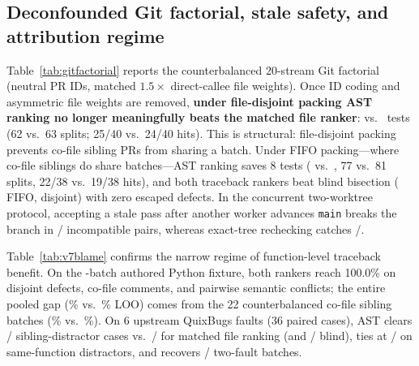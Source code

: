\subsection{Deconfounded Git factorial, stale safety, and attribution regime}

Table~\ref{tab:gitfactorial} reports the counterbalanced 20-stream Git factorial (neutral PR IDs, matched $1.5\times$ direct-callee file weights). Once ID coding and asymmetric file weights are removed, \textbf{under file-disjoint packing AST ranking no longer meaningfully beats the matched file ranker}: \GitDisjAstTests{} vs.\ \GitDisjFileTests{} tests (62 vs.\ 63 splits; 25/40 vs.\ 24/40 hits). This is structural: file-disjoint packing prevents co-file sibling PRs from sharing a batch. Under FIFO packing---where co-file siblings do share batches---AST ranking saves 8 tests (\GitFifoAstTests{} vs.\ \GitFifoFileTests{}, 77 vs.\ 81 splits, 22/38 vs.\ 19/38 hits), and both traceback rankers beat blind bisection (\GitFifoBisectTests{} FIFO, \GitDisjBisectTests{} disjoint) with zero escaped defects. In the concurrent two-worktree protocol, accepting a stale pass after another worker advances \texttt{main} breaks the branch in \StaleUnsafeEscapes{}/\StalePairsN{} incompatible pairs, whereas exact-tree rechecking catches \StaleRecheckCatches{}/\StalePairsN{}.

Table~\ref{tab:v7blame} confirms the narrow regime of function-level traceback benefit. On the \BlameTotalN{}-batch authored Python fixture, both rankers reach 100.0\% on disjoint defects, co-file comments, and pairwise semantic conflicts; the entire pooled gap (\BlameAstLoo{}\% vs.\ \BlameFileLoo{}\% LOO) comes from the 22 counterbalanced co-file sibling batches (\BlameAstSib{}\% vs.\ \BlameFileSib{}\%). On 6 upstream QuixBugs faults (36 paired cases), AST clears \QuixSiblingAst{}/\QuixSiblingN{} sibling-distractor cases vs.\ \QuixSiblingFile{}/\QuixSiblingN{} for matched file ranking (and \QuixSiblingBlind{}/\QuixSiblingN{} blind), ties at \QuixSameAst{}/\QuixSameN{} on same-function distractors, and recovers \QuixDoubleAst{}/\QuixDoubleN{} two-fault batches.

